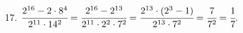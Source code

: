 17. $\cfrac{2^{16}-2\cdot 8^4}{2^{11}\cdot 14^2}=\cfrac{2^{16}-2^{13}}{2^{11}\cdot 2^2\cdot7^2}=\cfrac{2^{13}\cdot(2^3-1)}{2^{13}\cdot7^2}=\cfrac{7}{7^2}=\cfrac{1}{7}.$\\
